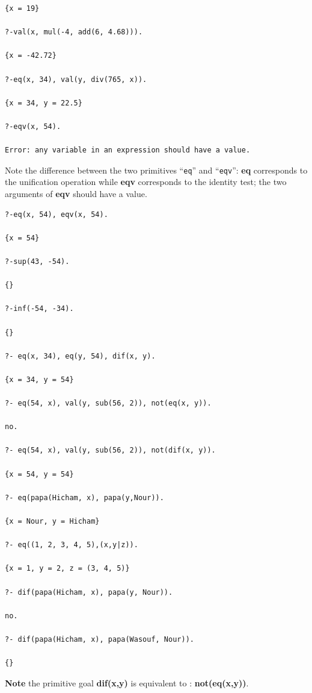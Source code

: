 \documentclass{book}
\begin{document}
\begin{verbatim}
{x = 19}

?-val(x, mul(-4, add(6, 4.68))).

{x = -42.72}

?-eq(x, 34), val(y, div(765, x)).

{x = 34, y = 22.5}

?-eqv(x, 54).

Error: any variable in an expression should have a value.

\end{verbatim}

Note the difference between the two primitives ``\texttt{eq}'' and
``\texttt{eqv}'': {\bf eq} corresponds to the unification operation
while {\bf eqv} corresponds to the identity test; the two arguments of
{\bf eqv} should have a value.


\begin{verbatim}
?-eq(x, 54), eqv(x, 54).

{x = 54}

?-sup(43, -54).

{}

?-inf(-54, -34).

{}

?- eq(x, 34), eq(y, 54), dif(x, y).

{x = 34, y = 54}

?- eq(54, x), val(y, sub(56, 2)), not(eq(x, y)).

no.

?- eq(54, x), val(y, sub(56, 2)), not(dif(x, y)).

{x = 54, y = 54}

?- eq(papa(Hicham, x), papa(y,Nour)).

{x = Nour, y = Hicham}

?- eq((1, 2, 3, 4, 5),(x,y|z)).

{x = 1, y = 2, z = (3, 4, 5)}

?- dif(papa(Hicham, x), papa(y, Nour)).

no.

?- dif(papa(Hicham, x), papa(Wasouf, Nour)).

{}

\end{verbatim}



{\bf Note} the primitive goal {\bf dif(x,y)} is equivalent to :
{\bf not(eq(x,y))}.
\end{document}
